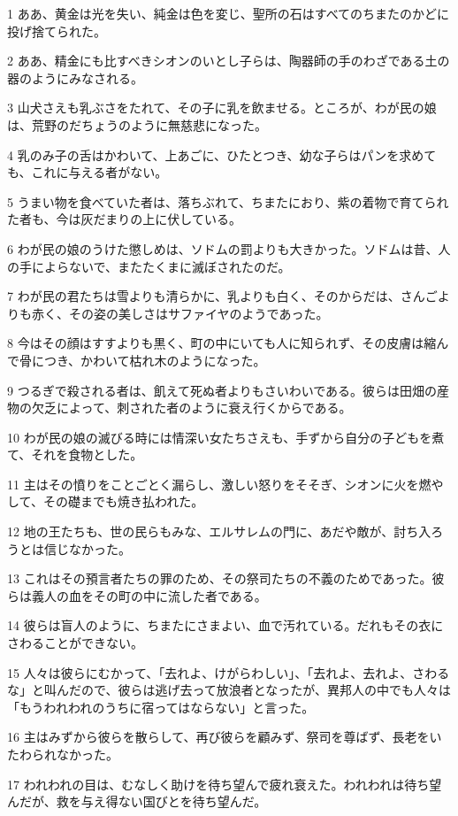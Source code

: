 \par 1 ああ、黄金は光を失い、純金は色を変じ、聖所の石はすべてのちまたのかどに投げ捨てられた。
\par 2 ああ、精金にも比すべきシオンのいとし子らは、陶器師の手のわざである土の器のようにみなされる。
\par 3 山犬さえも乳ぶさをたれて、その子に乳を飲ませる。ところが、わが民の娘は、荒野のだちょうのように無慈悲になった。
\par 4 乳のみ子の舌はかわいて、上あごに、ひたとつき、幼な子らはパンを求めても、これに与える者がない。
\par 5 うまい物を食べていた者は、落ちぶれて、ちまたにおり、紫の着物で育てられた者も、今は灰だまりの上に伏している。
\par 6 わが民の娘のうけた懲しめは、ソドムの罰よりも大きかった。ソドムは昔、人の手によらないで、またたくまに滅ぼされたのだ。
\par 7 わが民の君たちは雪よりも清らかに、乳よりも白く、そのからだは、さんごよりも赤く、その姿の美しさはサファイヤのようであった。
\par 8 今はその顔はすすよりも黒く、町の中にいても人に知られず、その皮膚は縮んで骨につき、かわいて枯れ木のようになった。
\par 9 つるぎで殺される者は、飢えて死ぬ者よりもさいわいである。彼らは田畑の産物の欠乏によって、刺された者のように衰え行くからである。
\par 10 わが民の娘の滅びる時には情深い女たちさえも、手ずから自分の子どもを煮て、それを食物とした。
\par 11 主はその憤りをことごとく漏らし、激しい怒りをそそぎ、シオンに火を燃やして、その礎までも焼き払われた。
\par 12 地の王たちも、世の民らもみな、エルサレムの門に、あだや敵が、討ち入ろうとは信じなかった。
\par 13 これはその預言者たちの罪のため、その祭司たちの不義のためであった。彼らは義人の血をその町の中に流した者である。
\par 14 彼らは盲人のように、ちまたにさまよい、血で汚れている。だれもその衣にさわることができない。
\par 15 人々は彼らにむかって、「去れよ、けがらわしい」、「去れよ、去れよ、さわるな」と叫んだので、彼らは逃げ去って放浪者となったが、異邦人の中でも人々は「もうわれわれのうちに宿ってはならない」と言った。
\par 16 主はみずから彼らを散らして、再び彼らを顧みず、祭司を尊ばず、長老をいたわられなかった。
\par 17 われわれの目は、むなしく助けを待ち望んで疲れ衰えた。われわれは待ち望んだが、救を与え得ない国びとを待ち望んだ。
